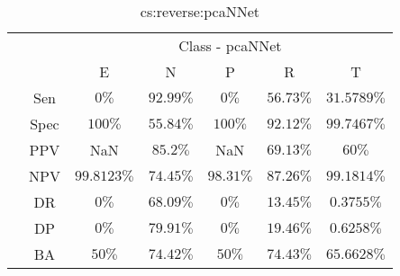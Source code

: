 \begin{table}[!ht]
	\centering
	\begin{tabular}{|c|c|c|c|c|c|c|}
		\cline{3-7}
		\multicolumn{2}{c|}{} & \multicolumn{5}{c|}{Class - pcaNNet} \\ \cline{3-7}
		\multicolumn{2}{c|}{} & E & N & P & R & T \\ \hline
		\multirow{7}{*}{\rotatebox{90}{Statistics}} & Sen & $0\%$ & $92.99\%$ & $0\%$ & $56.73\%$ & $31.5789\%$ \\ \cline{2-7}
		 & Spec & $100\%$ & $55.84\%$ & $100\%$ & $92.12\%$ & $99.7467\%$ \\ \cline{2-7}
		 & PPV & NaN & $85.2\%$ & NaN & $69.13\%$ & $60\%$ \\ \cline{2-7}
		 & NPV & $99.8123\%$ & $74.45\%$ & $98.31\%$ & $87.26\%$ & $99.1814\%$ \\ \cline{2-7}
		 & DR & $0\%$ & $68.09\%$ & $0\%$ & $13.45\%$ & $0.3755\%$ \\ \cline{2-7}
		 & DP & $0\%$ & $79.91\%$ & $0\%$ & $19.46\%$ & $0.6258\%$ \\ \cline{2-7}
		 & BA & $50\%$ & $74.42\%$ & $50\%$ & $74.43\%$ & $65.6628\%$ \\ \hline
	\end{tabular}
	\caption{cs:reverse:pcaNNet}
	\label{tab:cs:reverse:pcaNNet}
\end{table}
